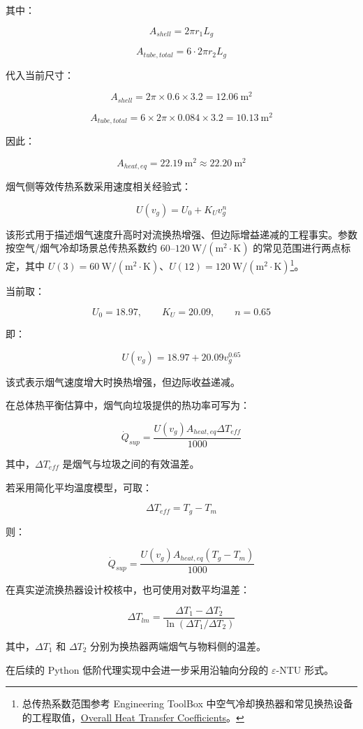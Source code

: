 \documentclass[UTF8,openany,zihao=-4,oneside]{ctexbook}
\begin{document}
其中：

\[
A_{shell}=2\pi r_1L_g
\]

\[
A_{tube,total}=6\cdot2\pi r_2L_g
\]

代入当前尺寸：

\[
A_{shell}=2\pi\times0.6\times3.2=12.06\ \mathrm{m^2}
\]

\[
A_{tube,total}=6\times2\pi\times0.084\times3.2=10.13\ \mathrm{m^2}
\]

因此：

\[
A_{heat,eq}=22.19\ \mathrm{m^2}\approx22.20\ \mathrm{m^2}
\]

烟气侧等效传热系数采用速度相关经验式：

\[
U(v_g)=U_0+K_Uv_g^n
\]

该形式用于描述烟气速度升高时对流换热增强、但边际增益递减的工程事实。参数按空气/烟气冷却场景总传热系数约 \(60\text{--}120\ \mathrm{W/(m^2\cdot K)}\) 的常见范围进行两点标定，其中 \(U(3)=60\ \mathrm{W/(m^2\cdot K)}\)、\(U(12)=120\ \mathrm{W/(m^2\cdot K)}\)\footnote{总传热系数范围参考 Engineering ToolBox 中空气冷却换热器和常见换热设备的工程取值，\href{https://www.engineeringtoolbox.com/heat-transfer-coefficients-exchangers-d_450.html}{Overall Heat Transfer Coefficients}。}。

当前取：

\[
U_0=18.97,
\qquad K_U=20.09,
\qquad n=0.65
\]

即：

\[
U(v_g)=18.97+20.09v_g^{0.65}
\]

该式表示烟气速度增大时换热增强，但边际收益递减。

在总体热平衡估算中，烟气向垃圾提供的热功率可写为：

\[
\dot Q_{sup}=\frac{U(v_g)A_{heat,eq}\Delta T_{eff}}{1000}
\]

其中，\(\Delta T_{eff}\) 是烟气与垃圾之间的有效温差。

若采用简化平均温度模型，可取：

\[
\Delta T_{eff}=T_g-T_m
\]

则：

\[
\dot Q_{sup}=\frac{U(v_g)A_{heat,eq}(T_g-T_m)}{1000}
\]

在真实逆流换热器设计校核中，也可使用对数平均温差：

\[
\Delta T_{lm}=\frac{\Delta T_1-\Delta T_2}{\ln(\Delta T_1/\Delta T_2)}
\]

其中，\(\Delta T_1\) 和 \(\Delta T_2\) 分别为换热器两端烟气与物料侧的温差。

在后续的 Python 低阶代理实现中会进一步采用沿轴向分段的 \(\varepsilon\)-NTU 形式。
\end{document}
